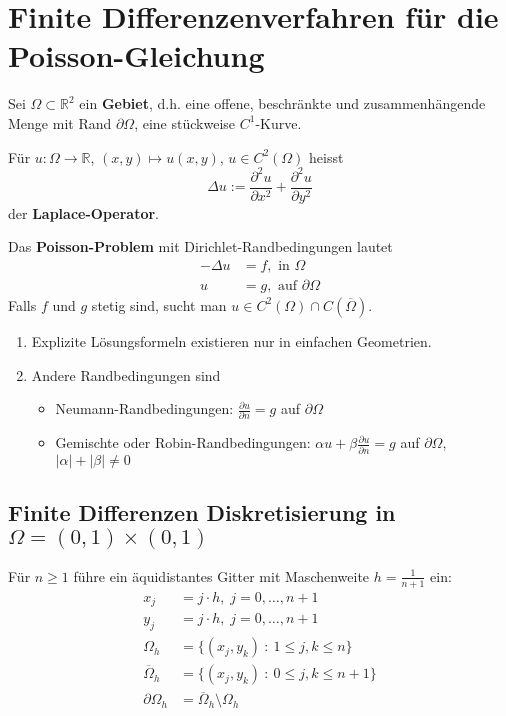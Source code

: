 \chapter{Finite Differenzenverfahren für die Poisson-Gleichung}


\begin{defi}
Sei $\Omega \subset \mathbb R^2$ ein \textbf{Gebiet}, d.h. eine offene, beschränkte und zusammenhängende Menge
mit Rand $\partial \Omega$, eine stückweise $C^1$-Kurve.

Für $u: \Omega \to \mathbb R$, $(x,y) \mapsto u(x,y)$, $u \in C^2(\Omega)$ heisst 
\[
\Delta u := \frac{\partial^2 u}{\partial x^2} + \frac{\partial^2 u}{\partial y^2}
\]
der \textbf{Laplace-Operator}.

Das \textbf{Poisson-Problem} mit Dirichlet-Randbedingungen lautet
\begin{align*}
- \Delta u &= f, \text{ in } \Omega \\
u &= g, \text{ auf } \partial \Omega
\end{align*}
Falls $f$ und $g$ stetig sind, sucht man $u \in C^2(\Omega) \cap C(\overline \Omega)$.
\end{defi}

\begin{bem}
\begin{enumerate}
\item Explizite Lösungsformeln existieren nur in einfachen Geometrien.
\item Andere Randbedingungen sind
\begin{itemize}
\item Neumann-Randbedingungen: $\frac{\partial u}{\partial n} = g$ auf $\partial \Omega$
\item Gemischte oder Robin-Randbedingungen: $\alpha u + \beta \frac{\partial u}{\partial n} = g$ auf $\partial \Omega$, 
$|\alpha| + |\beta| \neq 0$
\end{itemize}
\end{enumerate}
\end{bem}

\section{Finite Differenzen Diskretisierung in $\Omega = (0,1) \times (0,1)$}
Für $n \geq 1$ führe ein äquidistantes Gitter mit Maschenweite $h = \frac{1}{n+1}$ ein:
\begin{align*}
x_j &= j \cdot h, \; j = 0, \ldots, n+1 \\
y_j &= j \cdot h, \; j = 0, \ldots, n+1 \\
\Omega_h &= \{ (x_j, y_k) \ : \ 1 \leq j, k \leq n\} \\
\overline \Omega_h &= \{ (x_j, y_k) \ : \ 0 \leq j, k \leq n+1 \} \\
\partial \Omega_h &= \overline \Omega_h \setminus \Omega_h
\end{align*}

